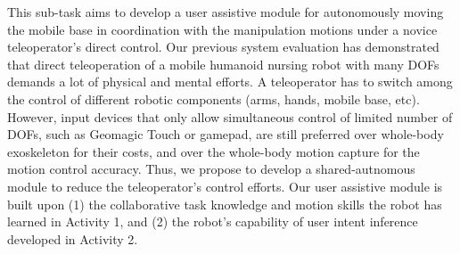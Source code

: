 \documentclass[letterpaper, 11 pt, onecolumn]{article}
\begin{document}
This sub-task aims to develop a user assistive module for autonomously moving the mobile base in coordination with the manipulation motions under a novice teleoperator's direct control. Our previous system evaluation has demonstrated that direct teleoperation of a mobile humanoid nursing robot with many DOFs demands a lot of physical and mental efforts. A teleoperator has to switch among the control of different robotic components (arms, hands, mobile base, etc). However, input devices that only allow simultaneous control of limited number of DOFs, such as Geomagic Touch or gamepad, are still preferred over whole-body exoskeleton for their costs, and over the whole-body motion capture for the motion control accuracy. Thus, we propose to develop a shared-autnomous module to reduce the teleoperator's control efforts. Our user assistive module is built upon (1) the collaborative task knowledge and motion skills the robot has learned in Activity 1, and (2) the robot's capability of user intent inference developed in Activity 2.  
\end{document}

